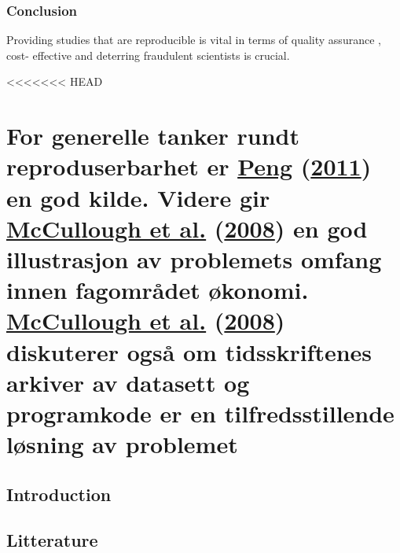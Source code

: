 \documentclass[
  12pt,
  norsk,
]{article}
\begin{document}
\hypertarget{conclusion}{%
\subsubsection{\texorpdfstring{\textbf{Conclusion}}{Conclusion}}\label{conclusion}}

Providing studies that are reproducible is vital in terms of quality
assurance , cost- effective and deterring fraudulent scientists is
crucial.

<<<<<<< HEAD
\hypertarget{for-generelle-tanker-rundt-reproduserbarhet-er-peng2011-en-god-kilde.-videre-gir-mccullough2008-en-god-illustrasjon-av-problemets-omfang-innen-fagomruxe5det-uxf8konomi.-mccullough2008-diskuterer-ogsuxe5-om-tidsskriftenes-arkiver-av-datasett-og-programkode-er-en-tilfredsstillende-luxf8sning-av-problemet}{%
\section{\texorpdfstring{For generelle tanker rundt reproduserbarhet er
\protect\hyperlink{ref-peng2011}{Peng}
(\protect\hyperlink{ref-peng2011}{2011}) en god kilde. Videre gir
\protect\hyperlink{ref-mccullough2008}{McCullough et al.}
(\protect\hyperlink{ref-mccullough2008}{2008}) en god illustrasjon av
problemets omfang innen fagområdet økonomi.
\protect\hyperlink{ref-mccullough2008}{McCullough et al.}
(\protect\hyperlink{ref-mccullough2008}{2008}) diskuterer også om
tidsskriftenes arkiver av datasett og programkode er en
tilfredsstillende løsning av
problemet}{For generelle tanker rundt reproduserbarhet er Peng (2011) en god kilde. Videre gir McCullough et al. (2008) en god illustrasjon av problemets omfang innen fagområdet økonomi. McCullough et al. (2008) diskuterer også om tidsskriftenes arkiver av datasett og programkode er en tilfredsstillende løsning av problemet}}\label{for-generelle-tanker-rundt-reproduserbarhet-er-peng2011-en-god-kilde.-videre-gir-mccullough2008-en-god-illustrasjon-av-problemets-omfang-innen-fagomruxe5det-uxf8konomi.-mccullough2008-diskuterer-ogsuxe5-om-tidsskriftenes-arkiver-av-datasett-og-programkode-er-en-tilfredsstillende-luxf8sning-av-problemet}}

\hypertarget{introduction-1}{%
\subsection{Introduction}\label{introduction-1}}

\hypertarget{litterature}{%
\subsection{Litterature}\label{litterature}}
\end{document}
